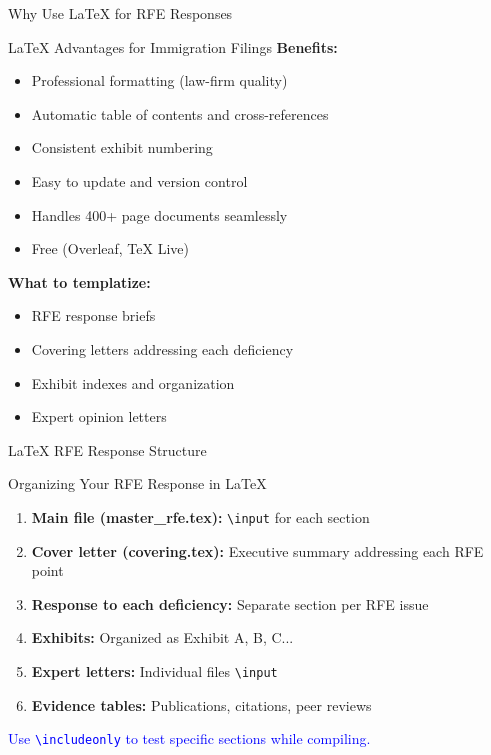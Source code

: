 \documentclass[11pt]{beamer}
\begin{document}
	\begin{frame}{Why Use LaTeX for RFE Responses}
		\scriptsize
		\begin{block}{LaTeX Advantages for Immigration Filings}
			\textbf{Benefits:}
			\begin{itemize}
				\item Professional formatting (law-firm quality)
				\item Automatic table of contents and cross-references
				\item Consistent exhibit numbering
				\item Easy to update and version control
				\item Handles 400+ page documents seamlessly
				\item Free (Overleaf, TeX Live)
			\end{itemize}
			\textbf{What to templatize:}
			\begin{itemize}
				\item RFE response briefs
				\item Covering letters addressing each deficiency
				\item Exhibit indexes and organization
				\item Expert opinion letters
			\end{itemize}
		\end{block}
	\end{frame}
	
	\begin{frame}{LaTeX RFE Response Structure}
		\scriptsize
		\begin{block}{Organizing Your RFE Response in LaTeX}
			\begin{enumerate}
				\item \textbf{Main file (master\_rfe.tex):} \texttt{\textbackslash input} for each section
				\item \textbf{Cover letter (covering.tex):} Executive summary addressing each RFE point
				\item \textbf{Response to each deficiency:} Separate section per RFE issue
				\item \textbf{Exhibits:} Organized as Exhibit A, B, C...
				\item \textbf{Expert letters:} Individual files \texttt{\textbackslash input}
				\item \textbf{Evidence tables:} Publications, citations, peer reviews
			\end{enumerate}
			\textcolor{blue}{Use \texttt{\textbackslash includeonly} to test specific sections while compiling.}
		\end{block}
	\end{frame}
	
\end{document}
